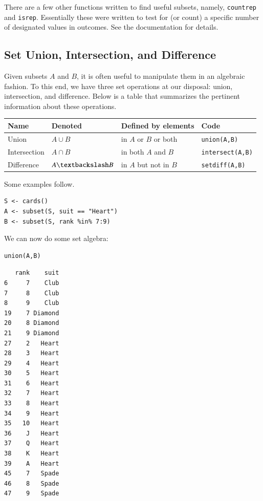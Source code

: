 \documentclass[captions=tableheading]{scrbook}
\begin{document}
There are a few other functions written to find useful subsets, namely, \texttt{countrep} and \texttt{isrep}. Essentially these were written to test for (or count) a specific number of designated values in outcomes. See the documentation for details.
\subsection{Set Union, Intersection, and Difference}
\label{sec-3-2-2}


Given subsets \(A\) and \(B\), it is often useful to manipulate them in an algebraic fashion. To this end, we have three set operations at our disposal: union, intersection, and difference. Below is a table that summarizes the pertinent information about these operations.


\begin{center}
\begin{tabular}{llll}
\hline
 Name          &  Denoted                &  Defined by elements        &  Code                     \\
\hline
 Union         &  \(A\cup B\)            &  in \(A\) or \(B\) or both  &  \texttt{union(A,B)}      \\
 Intersection  &  \(A\cap B\)            &  in both \(A\) and \(B\)    &  \texttt{intersect(A,B)}  \\
 Difference    &  \(A\textbackslash B\)  &  in \(A\) but not in \(B\)  &  \texttt{setdiff(A,B)}    \\
\hline
\end{tabular}
\end{center}




Some examples follow. 


\begin{verbatim}
S <- cards() 
A <- subset(S, suit == "Heart") 
B <- subset(S, rank %in% 7:9)
\end{verbatim}

We can now do some set algebra: 


\begin{verbatim}
union(A,B)
\end{verbatim}


\begin{verbatim}
   rank    suit
6     7    Club
7     8    Club
8     9    Club
19    7 Diamond
20    8 Diamond
21    9 Diamond
27    2   Heart
28    3   Heart
29    4   Heart
30    5   Heart
31    6   Heart
32    7   Heart
33    8   Heart
34    9   Heart
35   10   Heart
36    J   Heart
37    Q   Heart
38    K   Heart
39    A   Heart
45    7   Spade
46    8   Spade
47    9   Spade
\end{verbatim}
\end{document}
